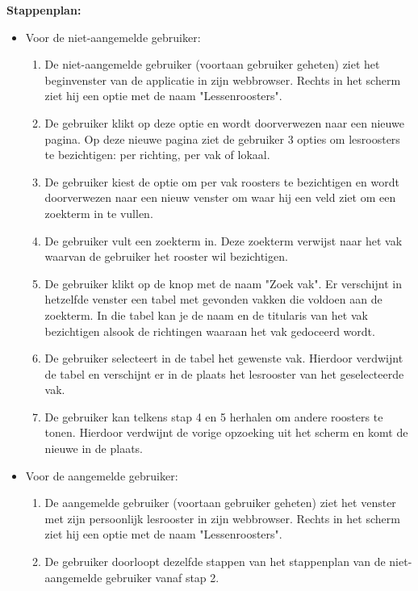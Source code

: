 \textbf{Stappenplan:}
\begin{itemize}
\item Voor de niet-aangemelde gebruiker: 
	\begin{enumerate}
		\item De niet-aangemelde gebruiker (voortaan gebruiker geheten) ziet het beginvenster van de applicatie in zijn webbrowser. Rechts in het scherm ziet hij een optie met de naam "Lessenroosters".
		\item De gebruiker klikt op deze optie en wordt doorverwezen naar een nieuwe pagina. Op deze nieuwe pagina ziet de gebruiker 3 opties om lesroosters te bezichtigen: per richting, per vak of lokaal.
		\item De gebruiker kiest de optie om per vak roosters te bezichtigen en wordt doorverwezen naar een nieuw venster om waar hij een veld ziet om een zoekterm in te vullen.
		\item De gebruiker vult een zoekterm in. Deze zoekterm verwijst naar het vak waarvan de gebruiker het rooster wil bezichtigen.
		\item De gebruiker klikt op de knop met de naam "Zoek vak". Er verschijnt in hetzelfde venster een tabel met gevonden vakken die voldoen aan de zoekterm. In die tabel kan je de naam en de titularis van het vak bezichtigen alsook de richtingen waaraan het vak gedoceerd wordt.
		\item De gebruiker selecteert in de tabel het gewenste vak. Hierdoor verdwijnt de tabel en verschijnt er in de plaats het lesrooster van het geselecteerde vak.
		\item De gebruiker kan telkens stap 4 en 5 herhalen om andere roosters te tonen. Hierdoor verdwijnt de vorige opzoeking uit het scherm en komt de nieuwe in de plaats.
	\end{enumerate}
\item Voor de aangemelde gebruiker:
	\begin{enumerate}
	\item De aangemelde gebruiker (voortaan gebruiker geheten) ziet het venster met zijn persoonlijk lesrooster in zijn webbrowser. Rechts in het scherm ziet hij een optie met de naam "Lessenroosters".
	\item De gebruiker doorloopt dezelfde stappen van het stappenplan van de niet-aangemelde gebruiker vanaf stap 2.
	\end{enumerate}
\end{itemize}

